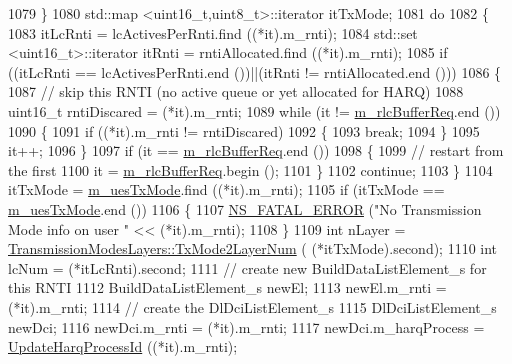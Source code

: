 \begin{DoxyCode}
1079     \}
1080   std::map <uint16\_t,uint8\_t>::iterator itTxMode;
1081   \textcolor{keywordflow}{do}
1082     \{
1083       itLcRnti = lcActivesPerRnti.find ((*it).m\_rnti);
1084       std::set <uint16\_t>::iterator itRnti = rntiAllocated.find ((*it).m\_rnti);
1085       \textcolor{keywordflow}{if} ((itLcRnti == lcActivesPerRnti.end ())||(itRnti != rntiAllocated.end ()))
1086         \{
1087           \textcolor{comment}{// skip this RNTI (no active queue or yet allocated for HARQ)}
1088           uint16\_t rntiDiscared = (*it).m\_rnti;
1089           \textcolor{keywordflow}{while} (it != \hyperlink{classns3_1_1RrFfMacScheduler_a25a4bfbb928e22dc026209de004b90fd}{m\_rlcBufferReq}.end ())
1090             \{
1091               \textcolor{keywordflow}{if} ((*it).m\_rnti != rntiDiscared)
1092                 \{
1093                   \textcolor{keywordflow}{break};
1094                 \}
1095               it++;
1096             \}
1097           \textcolor{keywordflow}{if} (it == \hyperlink{classns3_1_1RrFfMacScheduler_a25a4bfbb928e22dc026209de004b90fd}{m\_rlcBufferReq}.end ())
1098             \{
1099               \textcolor{comment}{// restart from the first}
1100               it = \hyperlink{classns3_1_1RrFfMacScheduler_a25a4bfbb928e22dc026209de004b90fd}{m\_rlcBufferReq}.begin ();
1101             \}
1102           \textcolor{keywordflow}{continue};
1103         \}
1104       itTxMode = \hyperlink{classns3_1_1RrFfMacScheduler_acaf305dd7717f4ced31f1dfc07df68ea}{m\_uesTxMode}.find ((*it).m\_rnti);
1105       \textcolor{keywordflow}{if} (itTxMode == \hyperlink{classns3_1_1RrFfMacScheduler_acaf305dd7717f4ced31f1dfc07df68ea}{m\_uesTxMode}.end ())
1106         \{
1107           \hyperlink{group__fatal_ga5131d5e3f75d7d4cbfd706ac456fdc85}{NS\_FATAL\_ERROR} (\textcolor{stringliteral}{"No Transmission Mode info on user "} << (*it).m\_rnti);
1108         \}
1109       \textcolor{keywordtype}{int} nLayer = \hyperlink{classns3_1_1TransmissionModesLayers_a31f608b7bfaa77440fe4cb85ad035329}{TransmissionModesLayers::TxMode2LayerNum} (
      (*itTxMode).second);
1110       \textcolor{keywordtype}{int} lcNum = (*itLcRnti).second;
1111       \textcolor{comment}{// create new BuildDataListElement\_s for this RNTI}
1112       BuildDataListElement\_s newEl;
1113       newEl.m\_rnti = (*it).m\_rnti;
1114       \textcolor{comment}{// create the DlDciListElement\_s}
1115       DlDciListElement\_s newDci;
1116       newDci.m\_rnti = (*it).m\_rnti;
1117       newDci.m\_harqProcess = \hyperlink{classns3_1_1RrFfMacScheduler_a4578e84d57b9602408f7a3af95ef152c}{UpdateHarqProcessId} ((*it).m\_rnti);

\end{DoxyCode}
